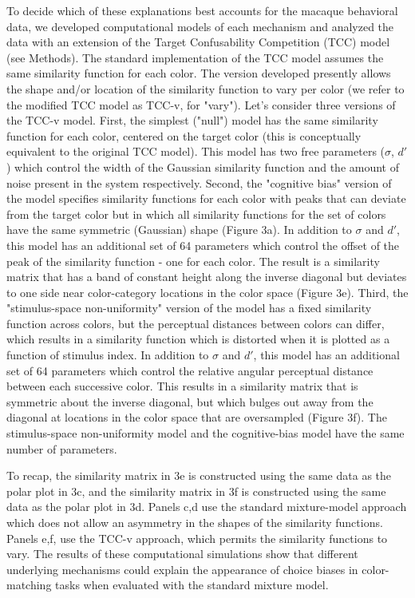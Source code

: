 \documentclass[9pt,biorxiv,lineno,onehalfspacing]{lapreprint}
\begin{document}
\begin{refsection}
To decide which of these explanations best accounts for the macaque behavioral data, we developed computational models of each mechanism and analyzed the data with an extension of the Target Confusability Competition (TCC) model \citep{schurgin_psychophysical_2020} (see Methods). 
The standard implementation of the TCC model assumes the same similarity function for each color. 
The version developed presently allows the shape and/or location of the similarity function to vary per color (we refer to the modified TCC model as TCC-v, for "vary"). 
Let's consider three versions of the TCC-v model. 
First, the simplest ("null") model has the same similarity function for each color, centered on the target color (this is conceptually equivalent to the original TCC model). 
This model has two free parameters ($\sigma$, $d'$) which control the width of the Gaussian similarity function and the amount of noise present in the system respectively.
Second, the "cognitive bias" version of the model specifies similarity functions for each color with peaks that can deviate from the target color but in which all similarity functions for the set of colors have the same symmetric (Gaussian) shape (Figure 3a). 
In addition to $\sigma$ and $d'$, this model has an additional set of 64 parameters which control the offset of the peak of the similarity function - one for each color.
The result is a similarity matrix that has a band of constant height along the inverse diagonal but deviates to one side near color-category locations in the color space (Figure 3e). 
Third, the "stimulus-space non-uniformity" version of the model has a fixed similarity function across colors, but the perceptual distances between colors can differ, which results in a similarity function which is distorted when it is plotted as a function of stimulus index.
In addition to $\sigma$ and $d'$, this model has an additional set of 64 parameters which control the relative angular perceptual distance between each successive color.
This results in a similarity matrix that is symmetric about the inverse diagonal, but which bulges out away from the diagonal at locations in the color space that are oversampled (Figure 3f). 
The stimulus-space non-uniformity model and the cognitive-bias model have the same number of parameters. 

To recap, the similarity matrix in 3e is constructed using the same data as the polar plot in 3c, and the similarity matrix in 3f is constructed using the same data as the polar plot in 3d. 
Panels c,d use the standard mixture-model approach which does not allow an asymmetry in the shapes of the similarity functions. 
Panels e,f, use the TCC-v approach, which permits the similarity functions to vary. 
The results of these computational simulations show that different underlying mechanisms could explain the appearance of choice biases in color-matching tasks when evaluated with the standard mixture model.


\end{refsection}
\end{document}
